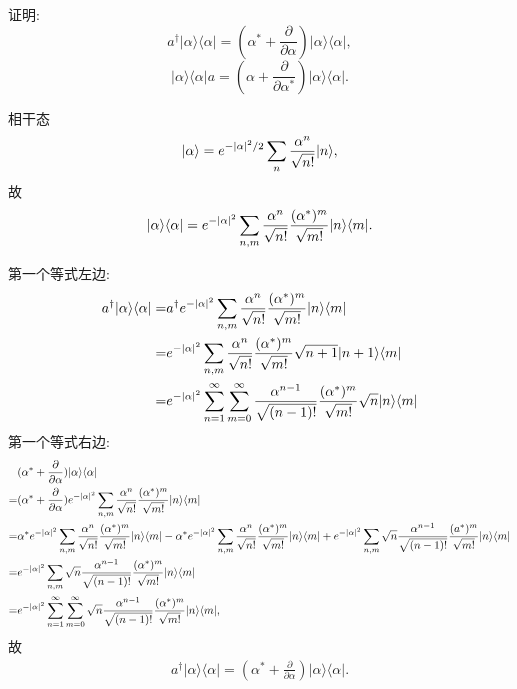 \documentclass{assignment}
\begin{document}
\begin{prob}
    证明:
    \[
        a^{\dagger}\lvert\alpha\rangle\langle\alpha\rvert=(\alpha^*+\frac{\partial}{\partial\alpha})\lvert\alpha\rangle\langle\alpha\rvert,
    \]
    \[
        \lvert\alpha\rangle\langle\alpha\rvert a=(\alpha+\frac{\partial}{\partial\alpha^*})\lvert\alpha\rangle\langle\alpha\rvert.
    \]
\end{prob}
\begin{pf}
    相干态
    \begin{align}
        \lvert\alpha\rangle=e^{-\left\lvert\alpha\right\rvert^2/2}\sum_n\frac{\alpha^n}{\sqrt{n!}}\lvert n\rangle,
    \end{align}
    故
    \begin{align}
        \lvert\alpha\rangle\langle\alpha\rvert=e^{-\left\lvert\alpha\right\rvert^2}\sum_{n,m}\frac{\alpha^n}{\sqrt{n!}}\frac{(\alpha^*)^m}{\sqrt{m!}}\lvert n\rangle\langle m\rvert.
    \end{align}

    第一个等式左边:
    \begin{align}
        \notag a^{\dagger}\lvert\alpha\rangle\langle\alpha\rvert=&a^{\dagger}e^{-\left\lvert\alpha\right\rvert^2}\sum_{n,m}\frac{\alpha^n}{\sqrt{n!}}\frac{(\alpha^*)^m}{\sqrt{m!}}\lvert n\rangle\langle m\rvert\\
        \notag=&e^{-\left\lvert\alpha\right\rvert^2}\sum_{n,m}\frac{\alpha^n}{\sqrt{n!}}\frac{(\alpha^*)^m}{\sqrt{m!}}\sqrt{n+1}\lvert n+1\rangle\langle m\rvert\\
        =&e^{-\left\lvert\alpha\right\rvert^2}\sum_{n=1}^{\infty}\sum_{m=0}^{\infty}\frac{\alpha^{n-1}}{\sqrt{(n-1)!}}\frac{(\alpha^*)^m}{\sqrt{m!}}\sqrt{n}\lvert n\rangle\langle m\rvert
    \end{align}
    第一个等式右边:
    \begin{align}
        \notag&(\alpha^*+\frac{\partial}{\partial\alpha})\lvert\alpha\rangle\langle\alpha\rvert\\
        \notag=&(\alpha^*+\frac{\partial}{\partial\alpha})e^{-\left\lvert\alpha\right\rvert^2}\sum_{n,m}\frac{\alpha^n}{\sqrt{n!}}\frac{(\alpha^*)^m}{\sqrt{m!}}\lvert n\rangle\langle m\rvert\\
        \notag=&\alpha^*e^{-\left\lvert\alpha\right\rvert^2}\sum_{n,m}\frac{\alpha^n}{\sqrt{n!}}\frac{(\alpha^*)^m}{\sqrt{m!}}\lvert n\rangle\langle m\rvert-\alpha^*e^{-\left\lvert\alpha\right\rvert^2}\sum_{n,m}\frac{\alpha^n}{\sqrt{n!}}\frac{(\alpha^*)^m}{\sqrt{m!}}\lvert n\rangle\langle m\rvert+e^{-\left\lvert\alpha\right\rvert^2}\sum_{n,m}\sqrt{n}\frac{\alpha^{n-1}}{\sqrt{(n-1)!}}\frac{(a^*)^m}{\sqrt{m!}}\lvert n\rangle\langle m\rvert\\
        \notag=&e^{-\left\lvert\alpha\right\rvert^2}\sum_{n,m}\sqrt{n}\frac{\alpha^{n-1}}{\sqrt{(n-1)!}}\frac{(\alpha^*)^m}{\sqrt{m!}}\lvert n\rangle\langle m\rvert\\
        =&e^{-\left\lvert\alpha\right\rvert^2}\sum_{n=1}^{\infty}\sum_{m=0}^{\infty}\sqrt{n}\frac{\alpha^{n-1}}{\sqrt{(n-1)!}}\frac{(\alpha^*)^m}{\sqrt{m!}}\lvert n\rangle\langle m\rvert,
    \end{align}
    故
    \begin{align}
        a^{\dagger}\lvert\alpha\rangle\langle\alpha\rvert=(\alpha^*+\frac{\partial}{\partial\alpha})\lvert\alpha\rangle\langle\alpha\rvert.
    \end{align}


\end{pf}
\end{document}
